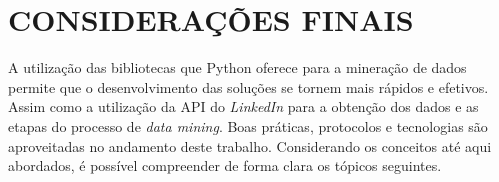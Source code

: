 \section{CONSIDERAÇÕES FINAIS}
A utilização das bibliotecas que Python oferece para a mineração de dados permite que o desenvolvimento das soluções se tornem mais rápidos e efetivos. Assim como a utilização da API do \textit{LinkedIn} para a obtenção dos dados e as etapas do processo de \textit{data mining}. Boas práticas, protocolos e tecnologias são aproveitadas no andamento deste trabalho. Considerando os conceitos até aqui abordados, é possível compreender de forma clara os tópicos seguintes.





















